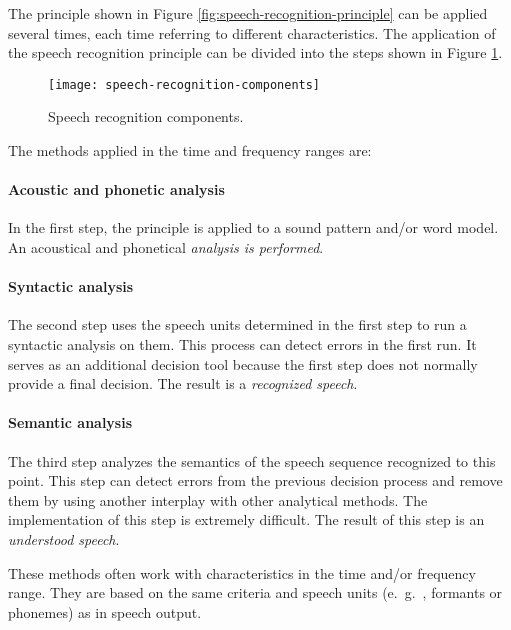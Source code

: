 The principle shown in Figure {\ref{fig:speech-recognition-principle}} can be applied several times, each time referring to different characteristics. The application of the speech recognition principle can be divided into the steps shown in Figure {\ref{fig:speech-recognition-components}}.

\begin{figure}[ht!]
	\centering
		\texttt{[image: speech-recognition-components]}
	\caption{Speech recognition components.}\label{fig:speech-recognition-components}
\end{figure}


The methods applied in the time and frequency ranges are:

\paragraph*{Acoustic and phonetic analysis}
In the first step, the principle is applied to a sound pattern and/or word model. An acoustical and phonetical \textit{analysis is performed}.

\paragraph*{Syntactic analysis}
The second step uses the speech units determined in the first step to run a syntactic analysis on them. This process can detect errors in the first run. It serves as an additional decision tool because the first step does not normally provide a final decision. The result is a \textit{recognized speech}.
	
\paragraph*{Semantic analysis}
The third step analyzes the semantics of the speech sequence recognized to this point. This step can detect errors from the previous decision process and remove them by using another interplay with other analytical methods. The implementation of this step is extremely difficult. The result of this step is an \textit{understood speech}.
	

\noindent These methods often work with characteristics in the time and/or frequency range. They are based on the same criteria and speech units (e.\ g.\ , formants or phonemes) as in speech output. 

